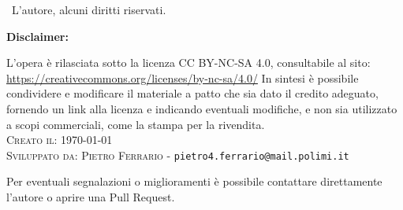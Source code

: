 \textcopyright \ L'autore, alcuni diritti riservati.\\
\vspace*{6pt}

\textbf{Disclaimer:} 
\vspace*{12pt}

L'opera è rilasciata sotto la licenza CC BY-NC-SA 4.0, consultabile al sito:\\
\url{https://creativecommons.org/licenses/by-nc-sa/4.0/}
\newline
In sintesi è possibile condividere e modificare il materiale a patto che sia dato il credito adeguato,  fornendo un link alla licenza e indicando eventuali modifiche, e non sia utilizzato a scopi commerciali, come la stampa per la rivendita.\\

\noindent\textsc{Creato il:} \today\\
\noindent\textsc{Sviluppato da:}
\textsc{Pietro Ferrario} - \texttt{pietro4.ferrario@mail.polimi.it}

Per eventuali segnalazioni o miglioramenti è possibile contattare direttamente l'autore o aprire una Pull Request.